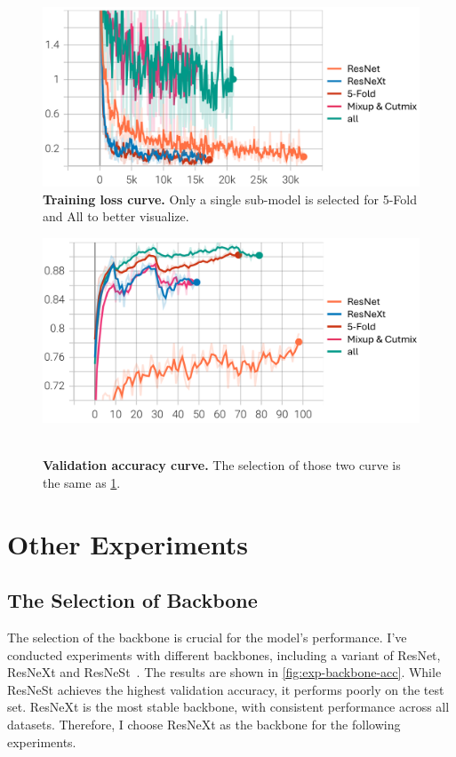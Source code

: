 \documentclass[10pt,twocolumn,letterpaper]{article}
\begin{document}
\begin{figure}[h]
  \centering
  \includegraphics[width=0.9\linewidth]{assets/train_loss.png}
  \caption{\textbf{Training loss curve.} Only a single sub-model is selected
    for 5-Fold and All to better visualize.}
  \label{fig:train-loss}
\end{figure}

\begin{figure}[h]
  \centering
  \includegraphics[width=0.9\linewidth]{assets/val_acc.png}\
  \caption{\textbf{Validation accuracy curve.} The selection of those two curve
    is the same as \cref{fig:train-loss}.}
  \label{fig:val-acc}
\end{figure}

\section*{Other Experiments}

\subsection*{The Selection of Backbone}

The selection of the backbone is crucial for the model's performance. I've
conducted experiments with different backbones, including a variant of ResNet,
ResNeXt and ResNeSt~\cite{zhang2020resnest}. The results are shown in
\cref{fig:exp-backbone-acc}. While ResNeSt achieves the highest validation
accuracy, it performs poorly on the test set. ResNeXt is the most stable
backbone, with consistent performance across all datasets. Therefore, I choose
ResNeXt as the backbone for the following experiments.
\end{document}
